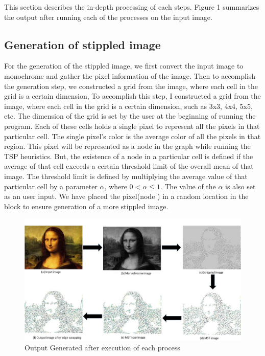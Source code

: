 \documentclass[a4paper,12pt]{article}
\begin{document}
This section describes the in-depth processing of each steps. Figure 1 summarizes the output after running each of the processes on the input image.  


\subsection{Generation of stippled image}
For the generation of the stippled image, we first convert the input image to monochrome and gather the pixel information of the image. Then to accomplish the generation step, we constructed a grid from the image, where each cell in the grid is a certain dimension,  To accomplish this step, I constructed a grid from the image, where each cell in the grid is a certain dimension, such as 3x3, 4x4, 5x5, etc. The dimension of the grid is set by the user at the beginning of running the program.  Each of these cells holds a single pixel to represent all the pixels in that particular cell.  The single pixel’s color is the average color of all the pixels in that region. This pixel will be represented as a node in the graph while running the TSP heuristics. But, the existence of a node in a particular cell is defined if the average of that cell exceeds a certain threshold limit of the overall mean of that image. The threshold limit is defined by multiplying the average value of that particular cell by a parameter $\alpha$, where $0<\alpha \leq1$. The value of the $\alpha$ is also set as an user input. We have placed the pixel(node ) in a random location in the block to ensure generation of a more stippled image. 

\begin{figure}[htb]
\centering
\includegraphics[width=\textwidth]{Report.jpg}
\caption{Output Generated after execution of each process}
\label{fig:pc3}
\end{figure}
\end{document}
